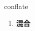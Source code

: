 
\begin{frame}
{\huge conflate}
\begin{center}
\begin{enumerate}\Large
  \item \textbf{混合}
\end{enumerate}
\end{center}
\end{frame}
